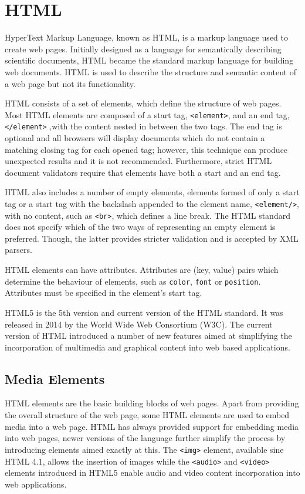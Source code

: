 \documentclass[10pt,a4paper,twoside]{book}
\begin{document}
\section{HTML}
HyperText Markup Language, known as HTML, is a markup language used to create web pages. Initially designed as a language for semantically describing scientific documents, HTML became the standard markup language for building web documents. HTML is used to describe the structure and semantic content of a web page but not its functionality\cite{world1999html}.

HTML consists of a set of elements, which define the structure of web pages. Most HTML elements are composed of a start tag, \texttt{<element>}, and an end tag, \texttt{</element>} ,with the content nested in between the two tags. The end tag is optional and all browsers will display documents which do not contain a matching closing tag for each opened tag; however, this technique can produce unexpected results and it is not recommended. Furthermore, strict HTML document validators require that elements have both a start and an end tag\cite{world1999html}.

HTML also includes a number of empty elements, elements formed of only a start tag or a start tag with the backslash appended to the element name, \texttt{<element/>}, with no content, such as \texttt{<br>}, which defines a line break. The HTML standard does not specify which of the two ways of representing an empty element is preferred. Though, the latter provides stricter validation and is accepted by XML parsers\cite{world1999html}.

HTML elements can have attributes. Attributes are (key, value) pairs which determine the behaviour of elements, such as \texttt{color}, \texttt{font} or \texttt{position}. Attributes must be specified in the element's start tag\cite{world1999html}.

HTML5 is the 5th version and current version of the HTML standard. It was released in 2014 by the World Wide Web Consortium (W3C). The current version of HTML introduced a number of new features aimed at simplifying the incorporation of multimedia and graphical content into web based applications\cite{berjon2014html}.

\subsection{Media Elements}
HTML elements are the basic building blocks of web pages. Apart from providing the overall structure of the web page, some HTML elements are used to embed media into a web page. HTML has always provided support for embedding media into web pages, newer versions of the language further simplify the process by introducing elements aimed exactly at this. The \texttt{<img>} element, available sine HTML 4.1, allows the insertion of images while the \texttt{<audio>} and \texttt{<video>} elements introduced in HTML5 enable audio and video content incorporation into web applications.
\end{document}
